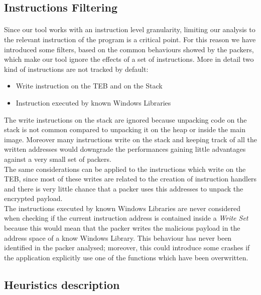 \subsection{Instructions Filtering}
\paragraph{}
Since our tool works with an instruction level granularity, limiting our analysis to the relevant instruction of the program is a critical point. For this reason we have introduced some filters, based on the common behaviours showed by the packers, which make our tool ignore the effects of a set of instructions. More in detail two kind of instructions are not tracked by default:
\begin{itemize}
	\item Write instruction on the TEB and on the Stack
	\item Instruction executed by known Windows Libraries
\end{itemize}
The write instructions on the stack are ignored because unpacking code on the stack is not common compared to unpacking it on the heap or inside the main image. Moreover many instructions write on the stack and keeping track of all the written addresses would downgrade the performances gaining little advantages against a very small set of packers.\\
The same considerations can be applied to the instructions which write on the TEB, since most of these writes are related to the creation of instruction handlers and there is very little chance that a packer uses this addresses to unpack the encrypted payload.\\
The instructions executed by known Windows Libraries are never considered when checking if the current instruction address is contained inside a \textit{Write Set} because this would mean that the packer writes the malicious payload in the address space of a know Windows Library. This behaviour has never been identified in the packer analysed; moreover, this could introduce some crashes if the application explicitly use one of the functions which have been overwritten.

\subsection{Heuristics description}

